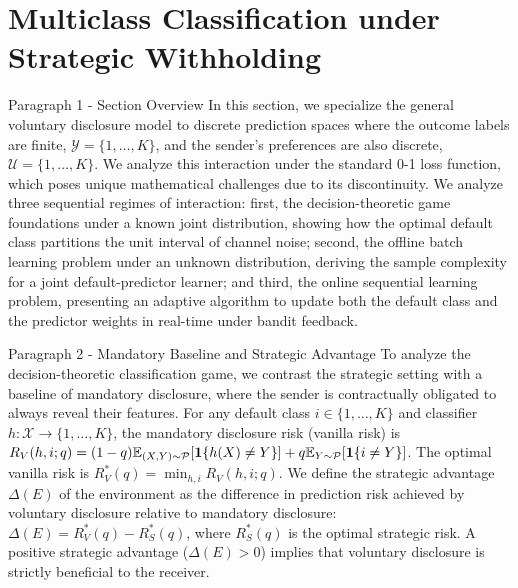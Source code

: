 \section{Multiclass Classification under Strategic Withholding}
\label{sec:classification}

\begin{sourceblock}{Paragraph 1 - Section Overview}
In this section, we specialize the general voluntary disclosure model to discrete prediction spaces where the outcome labels are finite, $\mathcal{Y} = \{1, \dots, K\}$, and the sender's preferences are also discrete, $\mathcal{U} = \{1, \dots, K\}$. We analyze this interaction under the standard 0-1 loss function, which poses unique mathematical challenges due to its discontinuity. We analyze three sequential regimes of interaction: first, the decision-theoretic game foundations under a known joint distribution, showing how the optimal default class partitions the unit interval of channel noise; second, the offline batch learning problem under an unknown distribution, deriving the sample complexity for a joint default-predictor learner; and third, the online sequential learning problem, presenting an adaptive algorithm to update both the default class and the predictor weights in real-time under bandit feedback.
\end{sourceblock}

\begin{faqblock}
\faqanswers
{}
\end{faqblock}

\begin{sourceblock}{Paragraph 2 - Mandatory Baseline and Strategic Advantage}
To analyze the decision-theoretic classification game, we contrast the strategic setting with a baseline of mandatory disclosure, where the sender is contractually obligated to always reveal their features. For any default class $i \in \{1,\dots,K\}$ and classifier $h: \mathcal{X} \to \{1,\dots,K\}$, the mandatory disclosure risk (vanilla risk) is $R_V(h, i; q) = (1 - q)\mathbb{E}_{(X, Y) \sim \mathcal{P}} [ \mathbf{1}\{h(X) \ne Y\} ] + q\mathbb{E}_{Y \sim \mathcal{P}} [ \mathbf{1}\{i \ne Y\} ]$. The optimal vanilla risk is $R_V^*(q) = \min_{h, i} R_V(h, i; q)$. We define the strategic advantage $\Delta(E)$ of the environment as the difference in prediction risk achieved by voluntary disclosure relative to mandatory disclosure: $\Delta(E) = R_V^*(q) - R_S^*(q)$, where $R_S^*(q)$ is the optimal strategic risk. A positive strategic advantage ($\Delta(E) > 0$) implies that voluntary disclosure is strictly beneficial to the receiver.
\end{sourceblock}

